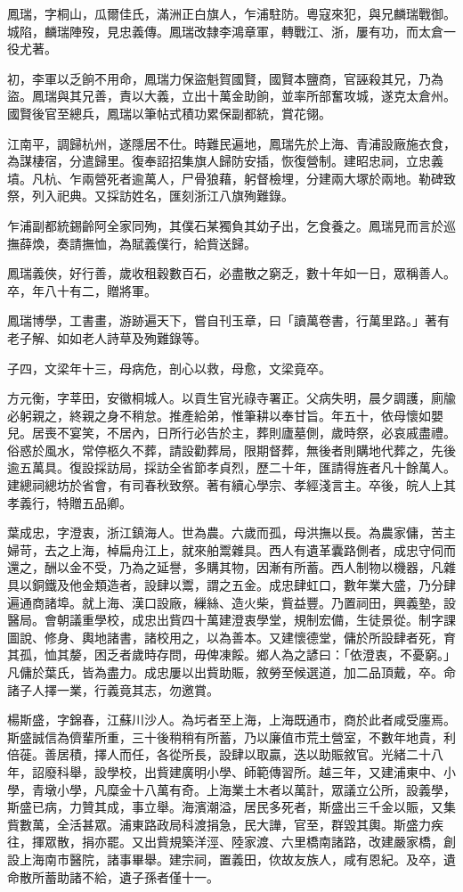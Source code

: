 \begin{pinyinscope}
鳳瑞，字桐山，瓜爾佳氏，滿洲正白旗人，乍浦駐防。粵寇來犯，與兄麟瑞戰御。城陷，麟瑞陣歿，見忠義傳。鳳瑞改隸李鴻章軍，轉戰江、浙，屢有功，而太倉一役尤著。

初，李軍以乏餉不用命，鳳瑞力保盜魁賀國賢，國賢本鹽商，官誣殺其兄，乃為盜。鳳瑞與其兄善，責以大義，立出十萬金助餉，並率所部奮攻城，遂克太倉州。國賢後官至總兵，鳳瑞以筆帖式積功累保副都統，賞花翎。

江南平，調歸杭州，遂隱居不仕。時難民遍地，鳳瑞先於上海、青浦設廠施衣食，為謀棲宿，分遣歸里。復奉詔招集旗人歸防安插，恢復營制。建昭忠祠，立忠義墳。凡杭、乍兩營死者逾萬人，尸骨狼藉，躬督檢埋，分建兩大塚於兩地。勒碑致祭，列入祀典。又採訪姓名，匯刻浙江八旗殉難錄。

乍浦副都統錫齡阿全家同殉，其僕石某獨負其幼子出，乞食養之。鳳瑞見而言於巡撫薛煥，奏請撫恤，為賦義僕行，給貲送歸。

鳳瑞義俠，好行善，歲收租穀數百石，必盡散之窮乏，數十年如一日，眾稱善人。卒，年八十有二，贈將軍。

鳳瑞博學，工書畫，游跡遍天下，嘗自刊玉章，曰「讀萬卷書，行萬里路。」著有老子解、如如老人詩草及殉難錄等。

子四，文梁年十三，母病危，剖心以救，母愈，文梁竟卒。

方元衡，字莘田，安徽桐城人。以貢生官光祿寺署正。父病失明，晨夕調護，廁牏必躬親之，終親之身不稍怠。推產給弟，惟筆耕以奉甘旨。年五十，依母懷如嬰兒。居喪不宴笑，不居內，日所行必告於主，葬則廬墓側，歲時祭，必哀戚盡禮。俗惑於風水，常停柩久不葬，請設勸葬局，限期督葬，無後者則購地代葬之，先後逾五萬具。復設採訪局，採訪全省節孝貞烈，歷二十年，匯請得旌者凡十餘萬人。建總祠總坊於省會，有司春秋致祭。著有續心學宗、孝經淺言主。卒後，皖人上其孝義行，特贈五品卿。

葉成忠，字澄衷，浙江鎮海人。世為農。六歲而孤，母洪撫以長。為農家傭，苦主婦苛，去之上海，棹扁舟江上，就來舶鬻雜具。西人有遺革囊路側者，成忠守伺而還之，酬以金不受，乃為之延譽，多購其物，因漸有所蓄。西人制物以機器，凡雜具以銅鐵及他金類造者，設肆以鬻，謂之五金。成忠肆虹口，數年業大盛，乃分肆遍通商諸埠。就上海、漢口設廠，繅絲、造火柴，貲益豐。乃置祠田，興義塾，設醫局。會朝議重學校，成忠出貲四十萬建澄衷學堂，規制宏備，生徒景從。制字課圖說、修身、輿地諸書，諸校用之，以為善本。又建懷德堂，傭於所設肆者死，育其孤，恤其嫠，困乏者歲時存問，毋俾凍餒。鄉人為之諺曰：「依澄衷，不憂窮。」凡傭於葉氏，皆為盡力。成忠屢以出貲助賑，敘勞至候選道，加二品頂戴，卒。命諸子人擇一業，行義竟其志，勿邀賞。

楊斯盛，字錦春，江蘇川沙人。為圬者至上海，上海既通市，商於此者咸受廛焉。斯盛誠信為儕輩所重，三十後稍稍有所蓄，乃以廉值市荒土營室，不數年地貴，利倍蓰。善居積，擇人而任，各從所長，設肆以取贏，迭以助賑敘官。光緒二十八年，詔廢科舉，設學校，出貲建廣明小學、師範傳習所。越三年，又建浦東中、小學，青墩小學，凡糜金十八萬有奇。上海業土木者以萬計，眾議立公所，設義學，斯盛已病，力贊其成，事立舉。海濱潮溢，居民多死者，斯盛出三千金以賑，又集貲數萬，全活甚眾。浦東路政局科渡捐急，民大譁，官至，群毀其輿。斯盛力疾往，揮眾散，捐亦罷。又出貲規築洋涇、陸家渡、六里橋南諸路，改建嚴家橋，創設上海南市醫院，諸事畢舉。建宗祠，置義田，佽故友族人，咸有恩紀。及卒，遺命散所蓄助諸不給，遺子孫者僅十一。


\end{pinyinscope}
